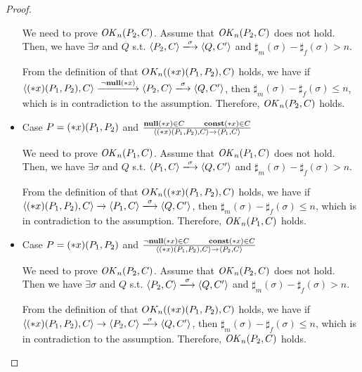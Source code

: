 \begin{proof}
\begin{itemize}
  We need to prove \(\mathit{OK}_n(P_2, C)\).  Assume that \(\mathit{OK}_n(P_2, C)\)
  does not hold. Then, we have \( \exists \sigma \) and \(Q\)
  s.t. \( \langle P_2, C \rangle \xlongrightarrow{\sigma} \langle Q,
  C' \rangle \) and \(\sharp_{m}(\sigma) -
  \sharp_{f}(\sigma) > n\).

  From the definition of that \(OK_n((*x)(P_1, P_2), C)\) holds, we
  have if \( \langle \Sirx(P_1, P_2), C \rangle \xlongrightarrow{\snnull}
  \langle P_2, C \rangle \xlongrightarrow{\sigma} \langle Q, C'
  \rangle \), then \(\sharp_m(\sigma) -
  \sharp_f(\sigma) \le n \), which is in
  contradiction to the assumption.  Therefore, \(\mathit{OK}_n(P_2, C)\)
  holds.

\item Case \( P = (*x)(P_1,P_2) \) and \( \frac{ {\bf null}(*x) \in C
  \quad\quad \mathbf{const}(*x) \in C} { \langle (*x)(P_1, P_2), C \rangle
  \rightarrow \langle P_1, C \rangle } \)

  We need to prove \(\mathit{OK}_n(P_1, C)\).  Assume that \(\mathit{OK}_n(P_1, C)\)
  does not hold. Then, we have \( \exists \sigma \) and \(Q\)
  s.t. \( \langle P_1, C \rangle \xlongrightarrow{\sigma} \langle Q,
  C' \rangle \) and \(\sharp_{m}(\sigma) -
  \sharp_{f}(\sigma) > n\).

  From the definition of that \(OK_n((*x)(P_1, P_2), C)\) holds, we
  have if \( \langle \Sirx(P_1, P_2), C \rangle \rightarrow
  \langle P_1, C \rangle \xlongrightarrow{\sigma} \langle Q, C'
  \rangle \), then \(\sharp_m(\sigma) -
  \sharp_f(\sigma) \le n \), which is in
  contradiction to the assumption.  Therefore, \(\mathit{OK}_n(P_1, C)\)
  holds.

\item Case \( P = (*x)(P_1,P_2) \) and \( \frac{ \neg{\bf null}(*x) \in C
  \quad\quad \mathbf{const}(*x) \in C} { \langle (*x)(P_1, P_2), C \rangle
  \rightarrow \langle P_2, C \rangle } \)

  We need to prove \(\mathit{OK}_n(P_2, C)\).  Assume that \(\mathit{OK}_n(P_2, C)\)
  does not hold. Then we have \( \exists \sigma \) and \(Q\)
  s.t. \( \langle P_2, C \rangle \xlongrightarrow{\sigma} \langle Q,
  C' \rangle \) and \(\sharp_{m}(\sigma) - \sharp_{f}(\sigma) > n\).

  From the definition of that \(OK_n((*x)(P_1, P_2), C)\) holds, we
  have if \( \langle \Sirx(P_1, P_2), C \rangle \rightarrow
  \langle P_2, C \rangle \xlongrightarrow{\sigma} \langle Q, C'
  \rangle \), then \(\sharp_m(\sigma) -
  \sharp_f(\sigma) \le n \), which is in
  contradiction to the assumption.  Therefore, \(\mathit{OK}_n(P_2, C)\)
  holds.


\end{itemize}
\end{proof}
